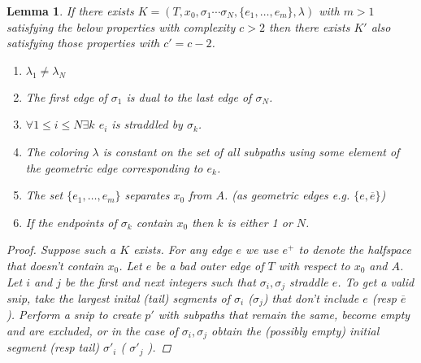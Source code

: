 \documentclass{article}
\theoremstyle{mystyle}
\newtheorem{lem}{Lemma}[section]
\theoremstyle{remark}
\begin{document}
\begin{lem}
	If there exists \(K=(T,x_{0} ,\sigma_{1} \cdots \sigma_{N} , \{ e_{ 1} ,\ldots, e_{m}  \}, \lambda )\) with \(m > 1\) satisfying the below properties with complexity \(c > 2\) then there exists \(K'\) also satisfying those properties with \(c' = c - 2\).
	\begin{enumerate}
		\item \(\lambda_{1} \neq \lambda_{N} \) 
		\item The first edge of \(\sigma_{1}\) is dual to the last edge of \(\sigma_{N}\).
		\item \(\forall 1 \leq i \leq N \exists k\) \(e_{i}\) is {\em straddled} by \(\sigma_k\).
		\item 	 The coloring \(\lambda\) is constant on the set of all subpaths using some element of the geometric edge corresponding to \(e_{k}\).
		\item 	 The set \(\{e_{1},\ldots, e_{m}\}\) separates \(x_{0}\) from \(A\). (as geometric edges e.g. \(\{e, \overline{e}\}\))

		\item If the endpoints of \(\sigma_{k}\) contain \(x_{0}\) then \(k\) is either 1 or \(N\).
	\end{enumerate}
	\begin{proof}
	 Suppose such a \(K\) exists. For any edge \(e\) we use \(e^{+}\) to denote the halfspace that doesn't contain \(x_{0}\). Let \(e\) be a bad outer edge of \(T\) with respect to \(x_{0}\) and \(A\). Let \(i\) and \(j\) be the first and next integers such that \(\sigma_{i} , \sigma_{j}\) straddle \(e\). To get a valid snip, take the largest inital (tail) segments of \(\sigma_{i}\) (\(\sigma_{j}\)) that don't include \(e\) (resp \(\overline{e}\) ). Perform a snip to create \(p'\) with subpaths that remain the same, become empty and are excluded, or in the case of \(\sigma_{i} , \sigma_{j}\) obtain the (possibly empty) initial segment (resp tail) \(\sigma'_{i}\) ( \(\sigma '_{j}\) ). 


\end{proof}
\end{lem}
\end{document}
